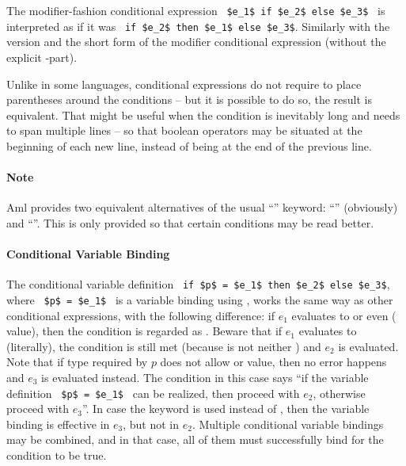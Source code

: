 The modifier-fashion conditional expression ~\lstinline!$e_1$ if $e_2$ else $e_3$!~ is interpreted as if it was ~\lstinline!if $e_2$ then $e_1$ else $e_3$!. Similarly with the  version and the short form of the modifier conditional expression (without the explicit -part). 

Unlike in some languages, conditional expressions do not require to place parentheses around the conditions -- but it is possible to do so, the result is equivalent. That might be useful when the condition is inevitably long and needs to span multiple lines -- so that boolean operators may be situated at the beginning of each new line, instead of being at the end of the previous line. 

\paragraph{Note}
Aml provides two equivalent alternatives of the usual ``'' keyword: ``'' (obviously) and ``''. This is only provided so that certain conditions may be read better.

\paragraph{Conditional Variable Binding}
The conditional variable definition ~\lstinline!if $p$ = $e_1$ then $e_2$ else $e_3$!, where ~\lstinline!$p$ = $e_1$!~ is a variable binding using , works the same way as other conditional expressions, with the following difference: if $e_1$ evaluates to  or even \code{()} ( value), then the condition is regarded as . Beware that if $e_1$ evaluates to  (literally), the condition is still met (because  is not  neither \code{()}) and $e_2$ is evaluated. Note that if type required by $p$ does not allow  or \code{()} value, then no error happens and $e_3$ is evaluated instead. The condition in this case says ``if the variable definition ~\lstinline!$p$ = $e_1$!~ can be realized, then proceed with $e_2$, otherwise proceed with $e_3$''. In case the  keyword is used instead of , then the variable binding is effective in $e_3$, but not in $e_2$. Multiple conditional variable bindings may be combined, and in that case, all of them must successfully bind for the condition to be true. 






